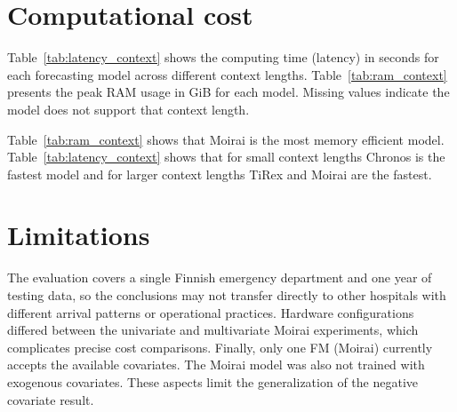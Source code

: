 \section{Computational cost}


Table~\ref{tab:latency_context} shows the computing time (latency) in seconds for each forecasting model across different context lengths. Table~\ref{tab:ram_context} presents the peak RAM usage in GiB for each model. Missing values indicate the model does not support that context length.

Table~\ref{tab:ram_context} shows that Moirai is the most memory efficient model. Table~\ref{tab:latency_context} shows that for small context lengths Chronos is the fastest model and for larger context lengths TiRex and Moirai are the fastest.





\section{Limitations}

The evaluation covers a single Finnish emergency department and one year of testing data, so the conclusions may not transfer directly to other hospitals with different arrival patterns or operational practices. Hardware configurations differed between the univariate and multivariate Moirai experiments, which complicates precise cost comparisons. Finally, only one FM (Moirai) currently accepts the available covariates. The Moirai model was also not trained with exogenous covariates. These aspects limit the generalization of the negative covariate result.
